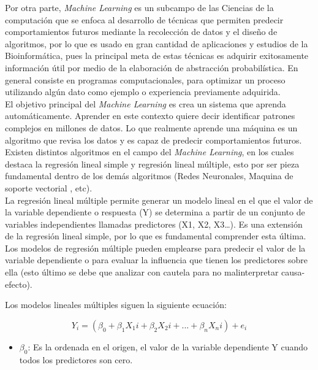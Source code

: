 {\noindent Por otra parte, \textit{Machine Learning} es un subcampo de las Ciencias de la computación que se enfoca al desarrollo de técnicas que permiten predecir comportamientos futuros mediante la recolección de datos y el diseño de algoritmos, por lo que es usado en gran cantidad de aplicaciones y estudios de la Bioinformática, pues la principal meta de estas técnicas es adquirir exitosamente información útil por medio de la elaboración de abstracción probabilística. En general consiste en programas computacionales, para optimizar un proceso utilizando algún dato como ejemplo o experiencia previamente adquirida.\\

\noindent El objetivo principal del \textit{Machine Learning} es crea un sistema que aprenda automáticamente. Aprender en este contexto quiere decir identificar patrones complejos en millones de datos. Lo que realmente aprende una máquina es un algoritmo que revisa los datos y es capaz de predecir comportamientos futuros.\\

\noindent Existen distintos algoritmos en el campo del \textit{Machine Learning}, en los cuales destaca la regresión lineal simple y regresión lineal múltiple, esto por ser pieza fundamental dentro de los demás algoritmos (Redes Neuronales, Maquina de soporte vectorial , etc).\\

\noindent La regresión lineal múltiple permite generar un modelo lineal en el que el valor de la variable dependiente o respuesta (Y) se determina a partir de un conjunto de variables independientes llamadas predictores (X1, X2, X3…). Es una extensión de la regresión lineal simple, por lo que es fundamental comprender esta última. Los modelos de regresión múltiple pueden emplearse para predecir el valor de la variable dependiente o para evaluar la influencia que tienen los predictores sobre ella (esto último se debe que analizar con cautela para no malinterpretar causa-efecto).

Los modelos lineales múltiples siguen la siguiente ecuación:

\begin{equation}
    Y_i = (\beta_0 + \beta_1 X_1i + \beta_2 X_2i + ... + \beta_n X_ni ) + e_i
\end{equation}

\begin{itemize}
   
 \item $\beta_0$: Es la ordenada en el origen, el valor de la variable dependiente Y cuando todos los predictores son cero.\\


\end{itemize}}
